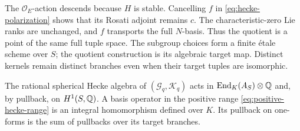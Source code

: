 The \(\mathcal O_E\)-action descends because \(H\) is stable.
Cancelling \(f\) in \eqref{eq:hecke-polarization} shows that its
Rosati adjoint remains \(c\).  The characteristic-zero Lie ranks
are unchanged, and \(f\) transports the full \(N\)-basis.  Thus
the quotient is a point of the same full tuple space.  The subgroup
choices form a finite étale scheme over \(S\); the quotient
construction is its algebraic target map.  Distinct kernels remain
distinct branches even when their target tuples are isomorphic.

\begin{lemma}\label{lem:hecke-albanese}
The rational spherical Hecke algebra of
\((\mathscr G_q,\mathscr K_q)\) acts in \(\operatorname{End}_K(A_S)\otimes\mathbb{Q}\) and,
by pullback, on \(H^1(S,\mathbb{Q})\).  A basis operator in the positive
range \eqref{eq:positive-hecke-range} is an integral homomorphism
defined over \(K\).  Its pullback on one-forms is the sum of
pullbacks over its target branches.
\end{lemma}

